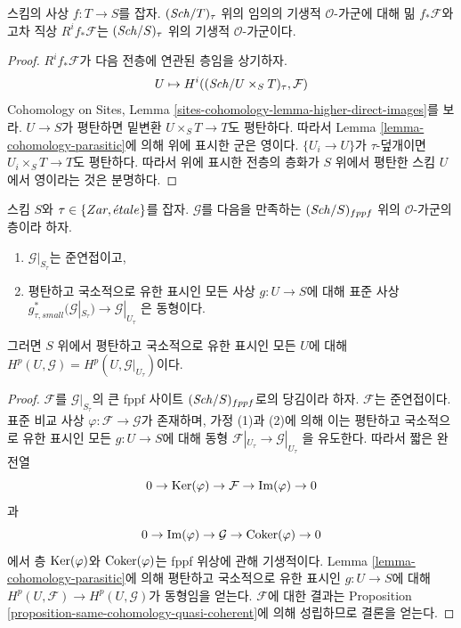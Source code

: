 \begin{lemma}
\label{lemma-direct-image-parasitic}
스킴의 사상 $f : T \to S$를 잡자. $(\mathit{Sch}/T)_\tau$ 위의 임의의 기생적
$\mathcal{O}$-가군에 대해 밂 $f_*\mathcal{F}$와 고차 직상
$R^if_*\mathcal{F}$는 $(\mathit{Sch}/S)_\tau$ 위의 기생적 $\mathcal{O}$-가군이다.
\end{lemma}

\begin{proof}
$R^if_*\mathcal{F}$가 다음 전층에 연관된 층임을 상기하자.
$$
U \mapsto H^i((\mathit{Sch}/U \times_S T)_\tau, \mathcal{F})
$$
Cohomology on Sites, Lemma
\ref{sites-cohomology-lemma-higher-direct-images}를 보라.
$U \to S$가 평탄하면 밑변환 $U \times_S T \to T$도 평탄하다. 따라서
Lemma \ref{lemma-cohomology-parasitic}에 의해 위에 표시한 군은 영이다.
$\{U_i \to U\}$가 $\tau$-덮개이면 $U_i \times_S T \to T$도 평탄하다.
따라서 위에 표시한 전층의 층화가 $S$ 위에서 평탄한 스킴 $U$에서
영이라는 것은 분명하다.
\end{proof}

\begin{lemma}
\label{lemma-quasi-coherent-and-flat-base-change}
스킴 $S$와 $\tau \in \{Zar, {\acute{e}tale}\}$를 잡자.
$\mathcal{G}$를 다음을 만족하는 $(\mathit{Sch}/S)_{fppf}$ 위의
$\mathcal{O}$-가군의 층이라 하자.
\begin{enumerate}
\item $\mathcal{G}|_{S_\tau}$는 준연접이고,
\item 평탄하고 국소적으로 유한 표시인 모든 사상 $g : U \to S$에 대해
표준 사상
$g_{\tau, small}^*(\mathcal{G}|_{S_\tau}) \to \mathcal{G}|_{U_\tau}$
은 동형이다.
\end{enumerate}
그러면 $S$ 위에서 평탄하고 국소적으로 유한 표시인 모든 $U$에 대해
$H^p(U, \mathcal{G}) = H^p(U, \mathcal{G}|_{U_\tau})$이다.
\end{lemma}

\begin{proof}
$\mathcal{F}$를 $\mathcal{G}|_{S_\tau}$의 큰 fppf 사이트
$(\mathit{Sch}/S)_{fppf}$로의 당김이라 하자. $\mathcal{F}$는 준연접이다.
표준 비교 사상 $\varphi : \mathcal{F} \to \mathcal{G}$가 존재하며,
가정 (1)과 (2)에 의해 이는 평탄하고 국소적으로 유한 표시인 모든
$g : U \to S$에 대해 동형
$\mathcal{F}|_{U_\tau} \to \mathcal{G}|_{U_\tau}$
을 유도한다. 따라서 짧은 완전열
$$
0 \to \mathop{\mathrm{Ker}}(\varphi) \to \mathcal{F} \to \mathop{\mathrm{Im}}(\varphi) \to 0
$$
과
$$
0 \to \mathop{\mathrm{Im}}(\varphi) \to \mathcal{G} \to \mathop{\mathrm{Coker}}(\varphi) \to 0
$$
에서 층 $\mathop{\mathrm{Ker}}(\varphi)$와 $\mathop{\mathrm{Coker}}(\varphi)$는 fppf 위상에 관해
기생적이다. Lemma \ref{lemma-cohomology-parasitic}에 의해 평탄하고
국소적으로 유한 표시인 $g : U \to S$에 대해
$H^p(U, \mathcal{F}) \to H^p(U, \mathcal{G})$가 동형임을 얻는다.
$\mathcal{F}$에 대한 결과는 Proposition
\ref{proposition-same-cohomology-quasi-coherent}에 의해 성립하므로
결론을 얻는다.
\end{proof}













